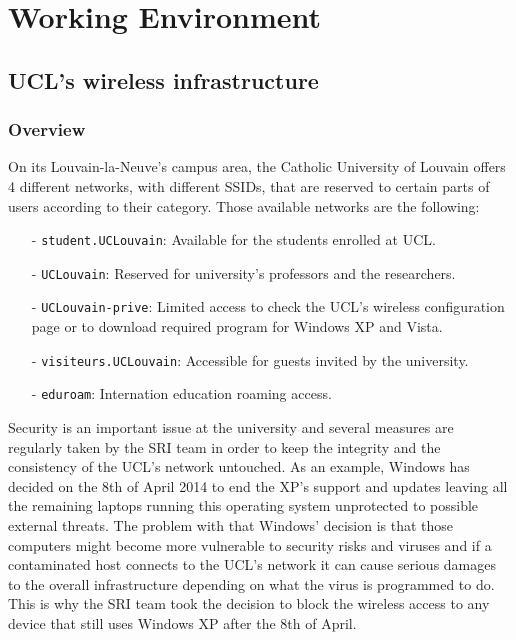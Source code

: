 
\chapter{Working Environment} %

\label{Chapter2} %



\section{UCL's wireless infrastructure}

\subsection{Overview}
On its Louvain-la-Neuve's campus area, the Catholic University of Louvain offers 4 different networks, with different SSIDs, that are reserved to certain parts of users according to their category. Those available networks are the following:
\begin{itemize}
	\item[-] \texttt{student.UCLouvain}: Available for the students enrolled at UCL.
	\item[-] \texttt{UCLouvain}: Reserved for university's professors and the researchers.
	\item[-] \texttt{UCLouvain-prive}: Limited access to check the UCL's wireless configuration page or to download required program for Windows XP and Vista.
	\item[-] \texttt{visiteurs.UCLouvain}: Accessible for guests invited by the university.
	\item[-] \texttt{eduroam}: Internation education roaming access.
\end{itemize}

Security is an important issue at the university and several measures are regularly taken by the SRI team in order to keep the integrity and the consistency of the UCL's network untouched. As an example, Windows has decided on the 8th of April 2014 to end the XP's support and updates leaving all the remaining laptops running this operating system unprotected to possible external threats\cite{windows}. The problem with that Windows' decision is that those computers might become more vulnerable to security risks and viruses and if a contaminated host connects to the UCL's network it can cause serious damages to the overall infrastructure depending on what the virus is programmed to do. This is why the SRI team took the decision to block the wireless access to any device that still uses Windows XP after the 8th of April.

